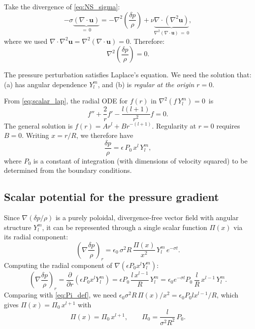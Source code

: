 \documentclass[12pt]{article}
\newcommand{\bu}{\bm{u}}
\theoremstyle{definition}
\begin{document}
\begin{derivbox}[Derivation: $\nabla^2(\delta p/\rho) = 0$]
Take the divergence of \eqref{eq:NS_sigma}:
\[
  -\sigma\underbrace{(\nabla\cdot\bu)}_{=\,0} 
  = -\nabla^2\!\left(\frac{\delta p}{\rho}\right) 
  + \nu\underbrace{\nabla\cdot(\nabla^2\bu)}_{\nabla^2(\nabla\cdot\bu)\,=\,0},
\]
where we used $\nabla\cdot\nabla^2\bu = \nabla^2(\nabla\cdot\bu) = 0$.
Therefore:
\begin{equation}
  \nabla^2\!\left(\frac{\delta p}{\rho}\right) = 0.
  \label{eq:pressure_Laplace}
\end{equation}
\end{derivbox}

The pressure perturbation satisfies Laplace's equation. We need the solution that:
(a) has angular dependence $Y_l^m$, and (b) is \emph{regular at the origin} $r=0$.

From \eqref{eq:scalar_lap}, the radial ODE for $f(r)$ in $\nabla^2(f\,Y_l^m) = 0$~is
\begin{equation}
  f'' + \frac{2}{r}f' - \frac{l(l+1)}{r^2}f = 0.
\end{equation}
The general solution is $f(r) = A r^l + B r^{-(l+1)}$. Regularity at $r=0$ requires
$B = 0$. Writing $x = r/R$, we therefore have
\begin{equation}
  \frac{\delta p}{\rho} = \epsilon\,P_0\,x^l\,Y_l^m,
  \label{eq:pressure_soln}
\end{equation}
where $P_0$ is a constant of integration (with dimensions of velocity squared)
to be determined from the boundary conditions.

\subsection{Scalar potential for the pressure gradient}

Since $\nabla(\delta p/\rho)$ is a purely poloidal, divergence-free vector field
with angular structure $Y_l^m$, it can be represented through a single scalar function
$\Pi(x)$ via its radial component:
\begin{equation}
  \left(\nabla\frac{\delta p}{\rho}\right)_r
  = \epsilon_0\,\sigma^2 R\,\frac{\Pi(x)}{x^2}\,Y_l^m\,e^{-\sigma t}.
  \label{eq:Pi_def}
\end{equation}
Computing the radial component of $\nabla(\epsilon P_0 x^l Y_l^m)$:
\[
  \left(\nabla\frac{\delta p}{\rho}\right)_r
  = \frac{\partial}{\partial r}\!\left(\epsilon P_0 x^l Y_l^m\right)
  = \epsilon P_0\,\frac{l\,x^{l-1}}{R}\,Y_l^m
  = \epsilon_0 e^{-\sigma t} P_0\,\frac{l}{R}\,x^{l-1}\,Y_l^m.
\]
Comparing with \eqref{eq:Pi_def}, we need
$\epsilon_0\sigma^2 R\,\Pi(x)/x^2 = \epsilon_0 P_0 l x^{l-1}/R$,
which gives $\Pi(x) = \Pi_0\,x^{l+1}$ with
\begin{equation}
  \Pi(x) = \Pi_0\,x^{l+1}, \qquad
  \Pi_0 = \frac{l}{\sigma^2 R^2}\,P_0.
  \label{eq:Pi_form}
\end{equation}
\end{document}

